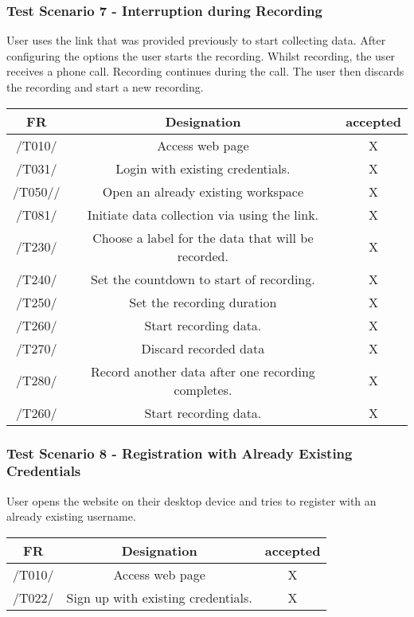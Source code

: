 \subsubsection{Test Scenario 7 - Interruption during Recording}
User uses the link that was provided previously to start collecting data. After configuring
the options the user starts the recording. Whilst recording, the user receives a phone
call. Recording continues during the call. The user then discards the recording and start
a new recording.
\begin{table}[h]
\begin{tabular}{!{\VRule}c!{\VRule}c!{\VRule}c!{\VRule}}
\hline
FR     & Designation                                                                    &accepted                \\
\hline
  /T010/ &  Access web page &   X  \\
 \hline
 /T031/  &  Login with existing credentials. &   X  \\
 \hline
 /T050//  &  Open an already existing workspace &   X  \\
 \hline
  /T081/  &  Initiate data collection via using the link. &   X  \\
 \hline
  /T230/   &  Choose a label for the data that will be recorded. &   X  \\
 \hline
 /T240/  &   Set the countdown to start of recording. &   X  \\
 \hline
  /T250/  &  Set the recording duration &   X \\
 \hline
 /T260/  &  Start recording data. &   X  \\
 \hline
  /T270/  &  Discard recorded data &  X   \\
 \hline
  /T280/   &  Record another data after one recording completes. &   X  \\
 \hline
 /T260/  &   Start recording data.
 &   X \\
 \hline
\end{tabular}
\end{table}

\subsubsection{Test Scenario 8 - Registration with Already Existing Credentials}
User opens the website on their desktop device and tries to register with an already
existing username.

\begin{table}[h]
\begin{tabular}{!{\VRule}c!{\VRule}c!{\VRule}c!{\VRule}}
\hline
FR     & Designation                                                                    &accepted                \\
\hline
  /T010/ &  Access web page &   X  \\
 \hline
 /T022/  &   Sign up with existing credentials. &   X  \\
 \hline

\end{tabular}
\end{table}
